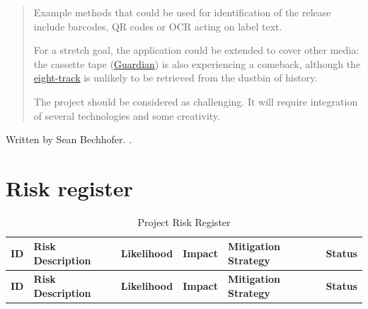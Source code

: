 \begin{uomappendix}
\begin{quote}
                Example methods that could be used for identification of the release include barcodes, QR codes or OCR acting on label text.
                
                For a stretch goal, the application could be extended to cover other media: the cassette tape (\href{https://www.theguardian.com/music/2023/apr/20/fun-way-consume-music-why-sales-of-cassette-tapes-soaring}{Guardian}) is also experiencing a comeback, although the \href{https://en.wikipedia.org/wiki/8-track_cartridge}{eight-track} is unlikely to be retrieved from the dustbin of history.
                
                The project should be considered as challenging. It will require integration of several technologies and some creativity.
            \end{quote}
    
            Written by Sean Bechhofer. \cite{bechhofervttspec}.
        
        \section{Risk register}
            
            \begin{longtable}{|c|p{3.2cm}|c|c|p{4.1cm}|p{3.0cm}|}
                \caption{Project Risk Register} \label{tab:riskRegister} \\
                
                \hline
                \textbf{ID} & \textbf{Risk Description} & \textbf{Likelihood} & \textbf{Impact} & \textbf{Mitigation Strategy} & \textbf{Status} \\ \hline
                \endfirsthead
                
                \hline
                \textbf{ID} & \textbf{Risk Description} & \textbf{Likelihood} & \textbf{Impact} & \textbf{Mitigation Strategy} & \textbf{Status} \\ \hline
                \endhead
    

\end{longtable}
\end{uomappendix}
